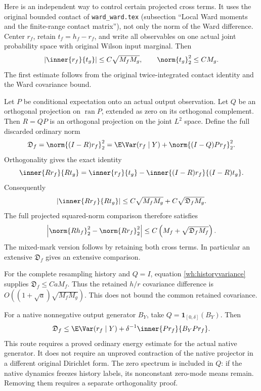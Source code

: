 Here is an independent way to control certain projected cross terms. It uses the original bounded contact of \texttt{ward\_ward.tex} (subsection ``Local Ward moments and the finite-range contact matrix''), not only the norm of the Ward difference. Center \(r_f\), retain \(t_f=h_f-r_f\), and write all observables on one actual joint probability space with original Wilson input marginal. Then
\[
 |\inner{r_f}{t_g}|\le C\sqrt{M_fM_g},\qquad
 \norm{t_g}_2^2\le CM_g.
\]
The first estimate follows from the original twice-integrated contact identity and the Ward covariance bound.

Let \(P\) be conditional expectation onto an actual output observation. Let \(Q\) be an orthogonal projection on \(\operatorname{ran}P\), extended as zero on its orthogonal complement. Then \(R=QP\) is an orthogonal projection on the joint \(L^2\) space. Define the full discarded ordinary norm
\[
 \mathfrak D_f=\norm{(I-R)r_f}_2^2
 =\E\Var(r_f\mid Y)+\norm{(I-Q)Pr_f}_2^2.
\]
Orthogonality gives the exact identity
\begin{equation}
 \inner{Rr_f}{Rt_g}
 =\inner{r_f}{t_g}
       -\inner{(I-R)r_f}{(I-R)t_g}.
 \label{wh:projectedcontact}
\end{equation}
Consequently
\begin{equation}
 |\inner{Rr_f}{Rt_g}|
 \le C\sqrt{M_fM_g}+C\sqrt{\mathfrak D_f M_g}.
 \label{wh:contactbound}
\end{equation}
The full projected squared-norm comparison therefore satisfies
\begin{equation}
 \left|\norm{Rh_f}_2^2-\norm{Rr_f}_2^2\right|
 \le C\left(M_f+\sqrt{\mathfrak D_fM_f}\right).
 \label{wh:squaredcomparison}
\end{equation}
The mixed-mark version follows by retaining both cross terms. In particular an extensive \(\mathfrak D_f\) gives an extensive comparison.

For the complete resampling history and \(Q=I\), equation \eqref{wh:historyvariance} supplies \(\mathfrak D_f\le CaM_f\). Thus the retained \(h/r\) covariance difference is \(O((1+\sqrt a)\sqrt{M_fM_g})\). This does not bound the common retained covariance.

For a native nonnegative output generator \(B_Y\), take
\(Q=\mathbf1_{[0,\delta]}(B_Y)\). Then
\[
 \mathfrak D_f
 \le \E\Var(r_f\mid Y)+
       \delta^{-1}\inner{Pr_f}{B_YPr_f}.
\]
This route requires a proved ordinary energy estimate for the actual native generator. It does not require an unproved contraction of the native projector in a different original Dirichlet form. The zero spectrum is included in \(Q\): if the native dynamics freezes history labels, its nonconstant zero-mode means remain. Removing them requires a separate orthogonality proof.

